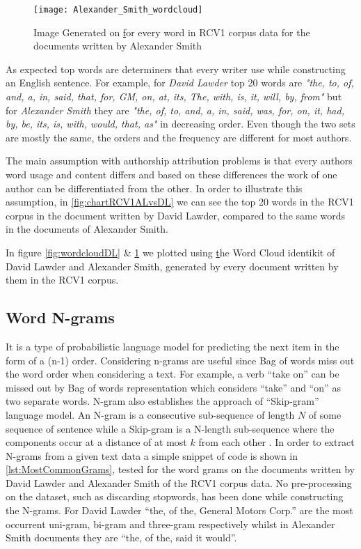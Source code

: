 \begin{figure}[ht]
	\centering
	\texttt{[image: Alexander\_Smith\_wordcloud]}
	\caption[Alexander Smith WordCloud in RCV1]{Image Generated on \href{wordclouds.com} for every word in RCV1 corpus data for the documents written by Alexander Smith}
	\label{fig:wordcloudAS}
\end{figure}

As expected top words are determiners that every writer use while constructing an English sentence. For example, for \textit{David Lawder} top 20 words are \textit{"the, to, of, and, a, in, said, that, for, GM, on, at, its, The, with, is, it, will, by, from"} but for \textit{Alexander Smith} they are \textit{"the, of, to, and, a, in, said, was, for, on, it, had, by, be, its, is, with, would, that, as"} in decreasing order. Even though the two sets are mostly the same, the orders and the frequency are different for most authors.

The main assumption with authorship attribution problems is that every authors word usage and content differs and based on these differences the work of one author can be differentiated from the other. In order to illustrate this assumption, in \ref{fig:chartRCV1ALvsDL} we can see the top 20 words in the RCV1 corpus in the document written by David Lawder, compared to the same words in the documents of Alexander Smith.

In figure \ref{fig:wordcloudDL} \& \ref{fig:wordcloudAS} we plotted using \href{wordclouds.com} the Word Cloud identikit of David Lawder and Alexander Smith, generated by every document written by them in the RCV1 corpus.


\subsection{Word N-grams}
It is a type of probabilistic language model for predicting the next item in the form of a (n-1) order. Considering n-grams are useful since Bag of words miss out the word order when considering a text. For example, a verb “take on” can be missed out by Bag of words representation which considers “take” and “on” as two separate words. N-gram also establishes the approach of “Skip-gram” language model. An N-gram is a consecutive sub-sequence of length $N$ of some sequence of sentence while a Skip-gram is a N-length sub-sequence where the components occur at a distance of at most $k$ from each other \cite{mikolov2013efficient}.
In order to extract N-grams from a given text data a simple snippet of code is shown in \ref{lst:MostCommonGrams}, tested for the word grams on the documents written by David Lawder and Alexander Smith of the RCV1 corpus data. No pre-processing on the dataset, such as discarding stopwords, has been done while constructing the N-grams. For David Lawder “the, of the, General Motors Corp.” are the most occurrent uni-gram, bi-gram and 
three-gram respectively whilst in Alexander Smith documents they are “the, of the, said it would”.

